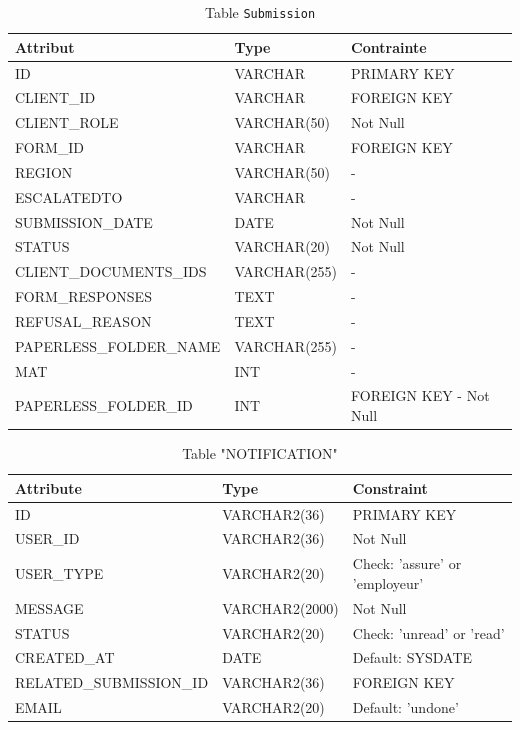 \begin{table}[h!]
\centering
\begin{tabular}{|l|l|l|}
\hline
\textbf{Attribut} & \textbf{Type} & \textbf{Contrainte} \\
\hline
ID & VARCHAR & PRIMARY KEY \\
CLIENT\_ID & VARCHAR & FOREIGN KEY \\
CLIENT\_ROLE & VARCHAR(50) & Not Null \\
FORM\_ID & VARCHAR & FOREIGN KEY \\
REGION & VARCHAR(50) & - \\
ESCALATEDTO & VARCHAR & - \\
SUBMISSION\_DATE & DATE & Not Null \\
STATUS & VARCHAR(20) & Not Null \\
CLIENT\_DOCUMENTS\_IDS & VARCHAR(255) & - \\
FORM\_RESPONSES & TEXT & - \\
REFUSAL\_REASON & TEXT & - \\
PAPERLESS\_FOLDER\_NAME & VARCHAR(255) & - \\
MAT & INT & - \\
PAPERLESS\_FOLDER\_ID & INT & FOREIGN KEY - Not Null \\
\hline
\end{tabular}
\caption{Table \texttt{Submission}}
\end{table}
\clearpage
\begin{table}[h]
\centering
\begin{tabular}{|l|l|l|}
\hline
\textbf{Attribute} & \textbf{Type} & \textbf{Constraint} \\ \hline
ID & VARCHAR2(36) & PRIMARY KEY \\ \hline
USER\_ID & VARCHAR2(36) & Not Null \\ \hline
USER\_TYPE & VARCHAR2(20) & Check: 'assure' or 'employeur' \\ \hline
MESSAGE & VARCHAR2(2000) & Not Null \\ \hline
STATUS & VARCHAR2(20) & Check: 'unread' or 'read' \\ \hline
CREATED\_AT & DATE & Default: SYSDATE \\ \hline
RELATED\_SUBMISSION\_ID & VARCHAR2(36) & FOREIGN KEY \\ \hline
EMAIL & VARCHAR2(20) & Default: 'undone' \\ \hline
\end{tabular}
\caption{Table "NOTIFICATION"}
\end{table}
